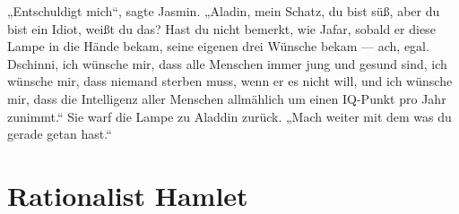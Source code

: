 „Entschuldigt mich“, sagte Jasmin.
„Aladin, mein Schatz, du bist süß, aber du bist ein Idiot, weißt du das? Hast du nicht bemerkt, wie Jafar, sobald er diese Lampe in die Hände bekam, seine eigenen drei Wünsche bekam — ach, egal. Dschinni, ich wünsche mir, dass alle Menschen immer jung und gesund sind, ich wünsche mir, dass niemand sterben muss, wenn er es nicht will, und ich wünsche mir, dass die Intelligenz aller Menschen allmählich um einen IQ-Punkt pro Jahr zunimmt.“ Sie warf die Lampe zu Aladdin zurück.
„Mach weiter mit dem was du gerade getan hast.“

\section{Rationalist Hamlet\protect\footnotemark}%

